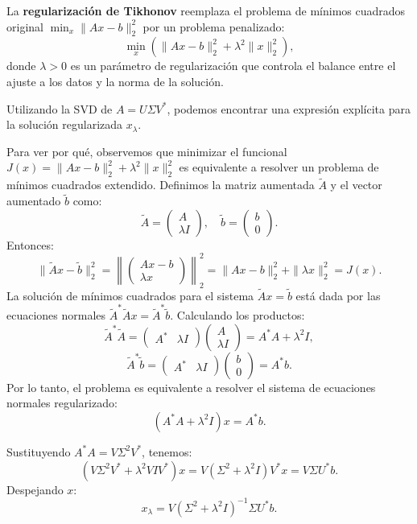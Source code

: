 \documentclass[a4paper,11pt]{report}
\begin{document}
La \textbf{regularización de Tikhonov} reemplaza el problema de mínimos cuadrados original $\min_x \|Ax - b\|_2^2$ por un problema penalizado:
\[
\min_x \left( \|Ax - b\|_2^2 + \lambda^2 \|x\|_2^2 \right),
\]
donde $\lambda > 0$ es un parámetro de regularización que controla el balance entre el ajuste a los datos y la norma de la solución.

Utilizando la SVD de $A = U \Sigma V^*$, podemos encontrar una expresión explícita para la solución regularizada $x_\lambda$.

Para ver por qué, observemos que minimizar el funcional $J(x) = \|Ax - b\|_2^2 + \lambda^2 \|x\|_2^2$ es equivalente a resolver un problema de mínimos cuadrados extendido. Definimos la matriz aumentada $\tilde{A}$ y el vector aumentado $\tilde{b}$ como:
\[
\tilde{A} = \begin{pmatrix} A \\ \lambda I \end{pmatrix}, \quad \tilde{b} = \begin{pmatrix} b \\ 0 \end{pmatrix}.
\]
Entonces:
\[
\|\tilde{A}x - \tilde{b}\|_2^2 = \left\| \begin{pmatrix} Ax - b \\ \lambda x \end{pmatrix} \right\|_2^2 = \|Ax - b\|_2^2 + \|\lambda x\|_2^2 = J(x).
\]
La solución de mínimos cuadrados para el sistema $\tilde{A}x = \tilde{b}$ está dada por las ecuaciones normales $\tilde{A}^*\tilde{A}x = \tilde{A}^*\tilde{b}$. Calculando los productos:
\[
\tilde{A}^*\tilde{A} = \begin{pmatrix} A^* & \lambda I \end{pmatrix} \begin{pmatrix} A \\ \lambda I \end{pmatrix} = A^*A + \lambda^2 I,
\]
\[
\tilde{A}^*\tilde{b} = \begin{pmatrix} A^* & \lambda I \end{pmatrix} \begin{pmatrix} b \\ 0 \end{pmatrix} = A^*b.
\]
Por lo tanto, el problema es equivalente a resolver el sistema de ecuaciones normales regularizado:
\[
(A^*A + \lambda^2 I) x = A^* b.
\]

Sustituyendo $A^*A = V \Sigma^2 V^*$, tenemos:
\[
(V \Sigma^2 V^* + \lambda^2 V I V^*) x = V (\Sigma^2 + \lambda^2 I) V^* x = V \Sigma U^* b.
\]
Despejando $x$:
\[
x_\lambda = V (\Sigma^2 + \lambda^2 I)^{-1} \Sigma U^* b.
\]
\end{document}

